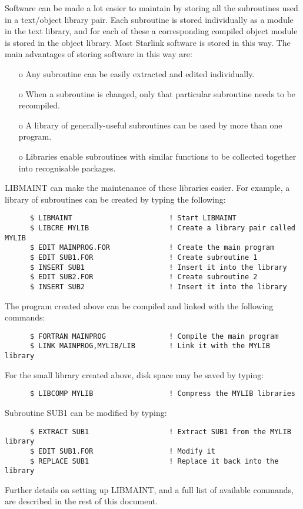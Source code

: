 Software can be made a lot easier to maintain by storing all the
subroutines used in a text/object library pair.
Each subroutine is stored individually as a module in the text library,
and for each of these a corresponding compiled object module is stored
in the object library.
Most Starlink software is stored in this way.
The main advantages of storing software in this way are:
\begin{itemize}
\item[o] Any subroutine can be easily extracted and edited
individually.
\item[o] When a subroutine is changed, only that particular
subroutine needs to be recompiled.
\item[o] A library of generally-useful subroutines can be used by
more than one program.
\item[o] Libraries enable subroutines with similar functions to be
collected together into recognisable packages.
\end{itemize}
LIBMAINT can make the maintenance of these libraries easier.
For example, a library of subroutines can be created by typing
the following:
\begin{verbatim}
      $ LIBMAINT                       ! Start LIBMAINT
      $ LIBCRE MYLIB                   ! Create a library pair called MYLIB
      $ EDIT MAINPROG.FOR              ! Create the main program
      $ EDIT SUB1.FOR                  ! Create subroutine 1
      $ INSERT SUB1                    ! Insert it into the library
      $ EDIT SUB2.FOR                  ! Create subroutine 2
      $ INSERT SUB2                    ! Insert it into the library
\end{verbatim}
The program created above can be compiled and linked with
the following commands:
\begin{verbatim}
      $ FORTRAN MAINPROG               ! Compile the main program
      $ LINK MAINPROG,MYLIB/LIB        ! Link it with the MYLIB library
\end{verbatim}
For the small library created above, disk space may be saved
by typing:
\begin{verbatim}
      $ LIBCOMP MYLIB                  ! Compress the MYLIB libraries
\end{verbatim}
Subroutine SUB1 can be modified by typing:
\begin{verbatim}
      $ EXTRACT SUB1                   ! Extract SUB1 from the MYLIB library
      $ EDIT SUB1.FOR                  ! Modify it
      $ REPLACE SUB1                   ! Replace it back into the library
\end{verbatim}
Further details on setting up LIBMAINT, and a full list of available
commands, are described in the rest of this document.

